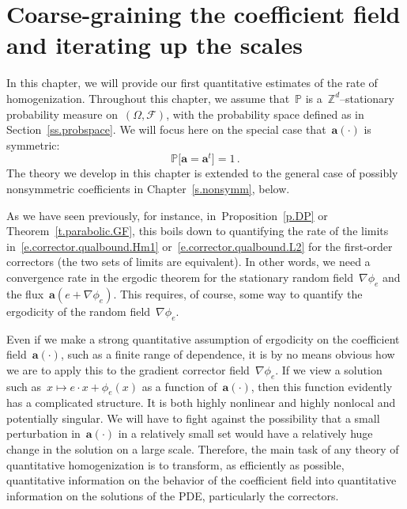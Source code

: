 \documentclass[11pt,twoside]{article} %
\numberwithin{equation}{section}
\theoremstyle{definition}
\newcommand*{\Zd}{\ensuremath{\mathbb{Z}^d}}
\renewcommand{\a}{\mathbf{a}}
\newcommand{\F}{\mathcal{F}}
\renewcommand{\P}{\mathbb{P}}
\begin{document}
\section{Coarse-graining the coefficient field and iterating up the scales}
\label{s.subadd}


In this chapter, we will provide our first quantitative estimates of the rate of homogenization. Throughout this chapter, we assume that~$\P$ is a~$\Zd$--stationary probability measure on~$(\Omega,\F)$, with the probability space defined as in Section~\ref{ss.probspace}. We will focus here on the special case that~$\a(\cdot)$ is symmetric:
\begin{equation}
\label{e.symm}
\P \bigl[  \a = \a^t \bigr] = 1 \,.
\end{equation}
The theory we develop in this chapter is extended to the general case of possibly nonsymmetric coefficients in Chapter~\ref{s.nonsymm}, below. 


\smallskip

As we have seen previously, for instance, in~Proposition~\ref{p.DP} or Theorem~\ref{t.parabolic.GF}, this boils down to quantifying the rate of the limits in~\eqref{e.corrector.qualbound.Hm1} or~\eqref{e.corrector.qualbound.L2} for the first-order correctors (the two sets of limits are equivalent). 
In other words, we need a convergence rate in the ergodic theorem for the stationary random field~$\nabla \phi_e$ and the flux~$\a(e+\nabla \phi_e)$. This requires, of course, some way to quantify the ergodicity of the random field~$\nabla \phi_e$. 

\smallskip

Even if we make a strong quantitative assumption of ergodicity on the coefficient field~$\a(\cdot)$, such as a finite range of dependence, it is by no means obvious how we are to apply this to the gradient corrector field~$\nabla \phi_e$.
If we view a solution such as~$x\mapsto e\cdot x + \phi_e(x)$ as a function of~$\a(\cdot)$, then this function evidently has a complicated structure. It is both highly nonlinear and highly nonlocal and potentially singular. We will have to fight against the possibility that a small perturbation in~$\a(\cdot)$ in a relatively small set would have a relatively huge change in the solution on a large scale.
Therefore, the main task of any theory of quantitative homogenization is to transform, as efficiently as possible, quantitative information on the behavior of the coefficient field into quantitative information on the solutions of the PDE, particularly the correctors.
\end{document}
